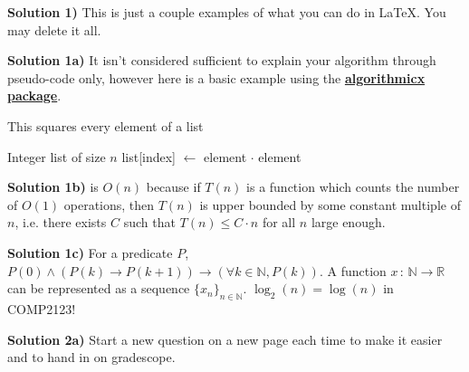 \documentclass[12pt]{article}
\newcommand{\N}{\mathbb{N}}
\newcommand{\R}{\mathbb{R}}
\newcommand{\map}[2]{\,{:}\,#1\!\longrightarrow\!#2}
\newcommand*\Let[2]{\State #1 $\gets$ #2}
\newcommand{\solution}[1]{\vspace{.2cm}\noindent \textbf{Solution #1)}}
\begin{document}
\solution{1} 
This is just a couple examples of what you can do in \LaTeX. 
You may delete it all. 

\solution{1a} 
It isn't considered sufficient to explain your algorithm through pseudo-code only, however here is a basic example using the \href{https://ctan.org/pkg/algorithmicx?lang=en}{\textbf{algorithmicx package}}.

\begin{algorithm}
    \caption{This squares every element of a list} \label{alg:pre}
    \begin{algorithmic}[1] %
        \Require Integer list of size $n$
        \Statex
                \Let{list[index]}{element $\cdot$ element}
            \EndFor
        \EndFunction
    \end{algorithmic}
\end{algorithm}

\solution{1b}
 is $O(n)$ because if $T(n)$ is a function which counts the number of $O(1)$ operations, then $T(n)$ is upper bounded by some constant multiple of $n$, i.e. there exists $C$ such that $T(n) \le C \cdot n$ for all $n$ large enough. 

\solution{1c} 
For a predicate $P$, $P(0) \wedge (P(k) \to P(k + 1)) \to (\forall k \in \N, P(k))$. 
A function $x\map{\N}{\R}$ can be represented as a sequence $\{x_n\}_{n \in \N}$.
$\log_2(n) = \log(n)$ in COMP2123!

\newpage
\solution{2a}
Start a new question on a new page each time to make it easier and to hand in on gradescope.
\end{document}
